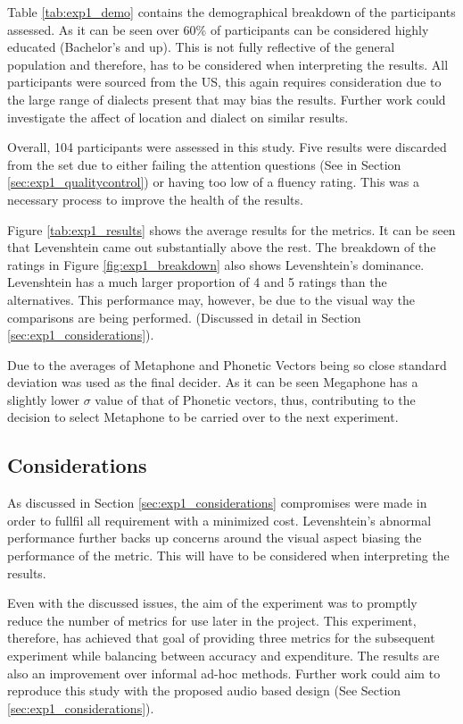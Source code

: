 Table \ref{tab:exp1_demo} contains the demographical breakdown of the participants assessed. As it can be seen over 60\% of participants can be considered highly educated (Bachelor’s and up). This is not fully reflective of the general population and therefore, has to be considered when interpreting the results. All participants were sourced from the US, this again requires consideration due to the large range of dialects present that may bias the results. Further work could investigate the affect of location and dialect on similar results. 

Overall, 104 participants were assessed in this study. Five results were discarded from the set due to either failing the attention questions (See in Section \ref{sec:exp1_qualitycontrol}) or having too low of a fluency rating. This was a necessary process to improve the health of the results. 

Figure \ref{tab:exp1_results} shows the average results for the metrics. It can be seen that Levenshtein came out substantially above the rest. The breakdown of the ratings in Figure \ref{fig:exp1_breakdown} also shows Levenshtein's dominance. Levenshtein has a much larger proportion of 4 and 5 ratings than the alternatives. This performance may, however, be due to the visual way the comparisons are being performed. (Discussed in detail in Section \ref{sec:exp1_considerations}). 

Due to the averages of Metaphone and Phonetic Vectors being so close standard deviation was used as the final decider. As it can be seen Megaphone has a slightly lower $\sigma$ value of that of Phonetic vectors, thus, contributing to the decision to select Metaphone to be carried over to the next experiment.

\subsection*{Considerations}
As discussed in Section \ref{sec:exp1_considerations} compromises were made in order to fullfil all requirement with a minimized cost. Levenshtein's abnormal performance further backs up concerns around the visual aspect biasing the performance of the metric. This will have to be considered when interpreting the results. 

Even with the discussed issues, the aim of the experiment was to promptly reduce the number of metrics for use later in the project. This experiment, therefore, has achieved that goal of providing three metrics for the subsequent experiment while balancing between accuracy and expenditure. The results are also an improvement over informal ad-hoc methods. Further work could aim to reproduce this study with the proposed audio based design (See Section \ref{sec:exp1_considerations}).

